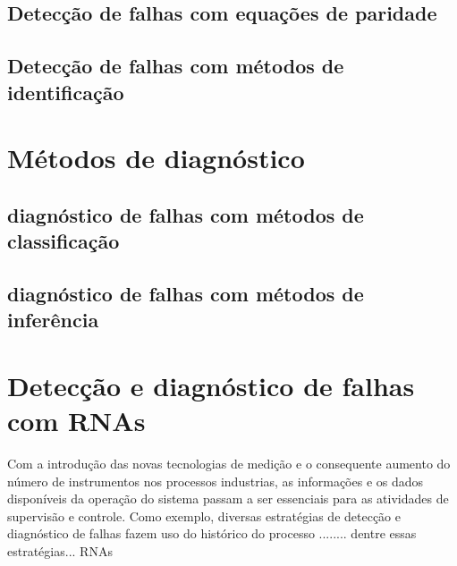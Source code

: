 \subsection{Detecção de falhas com equações de paridade}

\subsection{Detecção de falhas com métodos de identificação}

\section{Métodos de diagnóstico}

\subsection{diagnóstico de falhas com métodos de classificação}

\subsection{diagnóstico de falhas com métodos de inferência}

\section{Detecção e diagnóstico de falhas com RNAs}

Com a introdução das novas tecnologias de medição e o consequente aumento do
número de instrumentos nos processos industrias, as informações e os dados
disponíveis da operação do sistema passam a ser essenciais para as atividades de
supervisão e controle. Como exemplo, diversas estratégias de detecção e
diagnóstico de falhas fazem uso do histórico do processo ........ dentre essas
estratégias... RNAs

